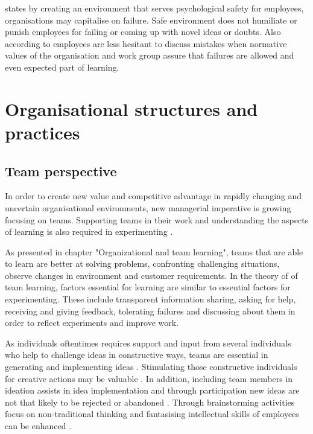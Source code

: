 \citet{garvin2008yours} states by creating an environment that serves psychological safety for employees, organisations may capitalise on failure. Safe environment does not humiliate or punish employees for failing or coming up with novel ideas or doubts. \citet{garvin2008yours} Also according to \citet{edmondson1996learning} employees are less hesitant to discuss mistakes when normative values of the organisation and work group assure that failures are allowed and even expected part of learning. 

\section{Organisational structures and practices}

\subsection{Team perspective}
In order to create new value and competitive advantage in rapidly changing and uncertain organisational environments, new managerial imperative is growing focusing on teams. Supporting teams in their work and understanding the aspects of learning is also required in experimenting \citep{edmondson1999psychological}. 

As presented in chapter "Organizational and team learning", teams that are able to learn are better at solving problems, confronting challenging situations, observe changes in environment and customer requirements. In the theory of\citet{edmondson1999psychological} of team learning, factors essential for learning are similar to essential factors for experimenting. These include transparent information sharing, asking for help, receiving and giving feedback, tolerating failures and discussing about them in order to reflect experiments and improve work. \citep{edmondson1999psychological}

As individuals oftentimes requires support and input from several individuals who help to challenge ideas in constructive ways, teams are essential in generating and implementing ideas \citep{mumford2002social}. Stimulating those constructive individuals for creative actions may be valuable \citep{robinson1997corporate}. In addition, including team members in ideation assists in idea implementation and through participation new ideas are not that likely to be rejected or abandoned \citep{agrell1994team}. Through brainstorming activities focus on non-traditional thinking and fantasising intellectual skills of employees can be enhanced \citep{sosik1998transformational}.

